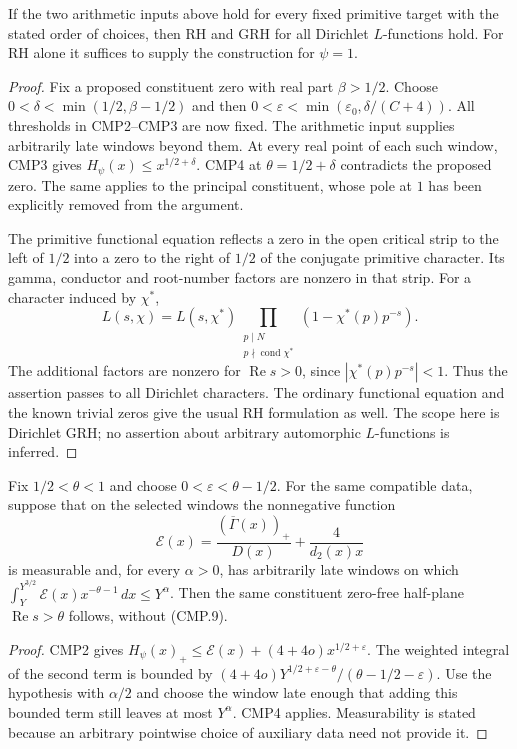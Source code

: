 \begin{theorem}
\label{claim:CMP5}
If the two arithmetic inputs above hold for every fixed primitive
target with the stated order of choices, then RH and GRH for all
Dirichlet $L$-functions hold.  For RH alone it suffices to supply
the construction for $\psi=1$.
\end{theorem}
\begin{proof}
Fix a proposed constituent zero with real part $\beta>1/2$.
Choose $0<\delta<\min(1/2,\beta-1/2)$ and then
$0<\varepsilon<\min(\varepsilon_0,\delta/(C+4))$.
All thresholds in CMP2--CMP3 are now fixed.  The arithmetic input
supplies arbitrarily late windows beyond them.  At every real
point of each such window, CMP3 gives
$H_\psi(x)\le x^{1/2+\delta}$.
CMP4 at $\theta=1/2+\delta$ contradicts the proposed zero.
The same applies to the principal constituent, whose pole at $1$
has been explicitly removed from the argument.

The primitive functional equation reflects a zero in the open
critical strip to the left of $1/2$ into a zero to the right of
$1/2$ of the conjugate primitive character.  Its gamma, conductor
and root-number factors are nonzero in that strip.  For a character
induced by $\chi^*$,
\[
 L(s,\chi)=L(s,\chi^*)
       \prod_{\substack{p\mid N\\p\nmid\operatorname{cond}\chi^*}}
                                      (1-\chi^*(p)p^{-s}).
\]
The additional factors are nonzero for $\operatorname{Re}s>0$,
since $|\chi^*(p)p^{-s}|<1$.  Thus the assertion passes to all
Dirichlet characters.  The ordinary functional equation and the
known trivial zeros give the usual RH formulation as well.
The scope here is Dirichlet GRH; no assertion about arbitrary
automorphic $L$-functions is inferred.
\end{proof}

\begin{corollary}
\label{claim:CMP6}
Fix $1/2<\theta<1$ and choose $0<\varepsilon<\theta-1/2$.
For the same compatible data, suppose that on the selected windows
the nonnegative function
\[
 \mathcal E(x)=\frac{(\overline\Gamma(x))_+}{D(x)}
                                      +\frac4{d_2(x)x}
 \tag{CMP.19}
\]
is measurable and, for every $\alpha>0$, has arbitrarily late
windows on which
$\int_Y^{Y^{3/2}}\mathcal E(x)x^{-\theta-1}\,dx\le Y^\alpha$.
Then the same constituent zero-free half-plane
$\operatorname{Re}s>\theta$ follows, without (CMP.9).
\end{corollary}
\begin{proof}
CMP2 gives
$H_\psi(x)_+\le\mathcal E(x)+(4+4o)x^{1/2+\varepsilon}$.
The weighted integral of the second term is bounded by
$(4+4o)Y^{1/2+\varepsilon-\theta}/
             (\theta-1/2-\varepsilon)$.
Use the hypothesis with $\alpha/2$ and choose the window late
enough that adding this bounded term still leaves at most
$Y^\alpha$.  CMP4 applies.  Measurability is stated because an
arbitrary pointwise choice of auxiliary data need not provide it.
\end{proof}

